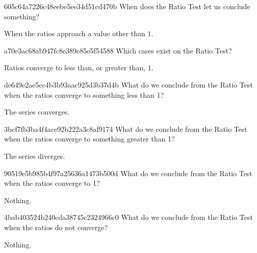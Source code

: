 \begin{note}{605c64a7226c48eebe5ee34d51cd470b}
    When does the Ratio Test let us conclude something?

    \begin{cloze}{1}
        When the ratios approach a value other than \({ 1 }\).
    \end{cloze}
\end{note}

\begin{note}{a70e3ac68ab947fc8e389e85e5f54588}
    Which cases exist on the Ratio Test?

    \begin{cloze}{1}
        Ratios converge to less than, or greater than, \({ 1 }\).
    \end{cloze}
\end{note}

\begin{note}{de649e2ae5cc4b3b93aac925d3b37d4b}
    What do we conclude from the Ratio Test when the ratios converge to something less than 1?

    \begin{cloze}{1}
        The series converges.
    \end{cloze}
\end{note}

\begin{note}{3bcf7fb3ba4f4ace92b222a3c8af9174}
    What do we conclude from the Ratio Test when the ratios converge to something greater than 1?

    \begin{cloze}{1}
        The series diverges.
    \end{cloze}
\end{note}

\begin{note}{90519e5b985b4f97a25636a1473b500d}
    What do we conclude from the Ratio Test when the ratios converge to 1?

    \begin{cloze}{1}
        Nothing.
    \end{cloze}
\end{note}

\begin{note}{4bab403524b240cda38745c2324966c0}
    What do we conclude from the Ratio Test when the ratios do not converge?

    \begin{cloze}{1}
        Nothing.
    \end{cloze}
\end{note}

